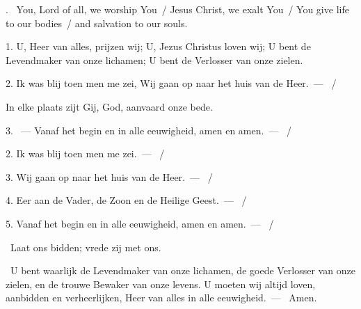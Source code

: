 \documentclass[12pt,twoside,a5paper]{article}
\begin{document}

\CLEARPAGEAV


\vspace{0.5em}

\vspace{0.4em}
\begin{doublecols}
  . \rr~You, Lord of all, we worship You~/ Jesus Christ, we exalt You~/ You give life to our bodies~/ and salvation to our souls.

   1. U, Heer van alles, prijzen wij; U, Jezus Christus loven wij; U bent de Levendmaker van onze lichamen; U bent de Verlosser van onze zielen.
\end{doublecols}

\begin{halfparskip}
  2. Ik was blij toen men me zei, Wij gaan op naar het huis van de Heer.~--- ~/ 

  \liturgicallbracket{} In elke plaats zijt Gij, God, aanvaard onze bede.\liturgicalrbracket

  3. ~--- Vanaf het begin en in alle eeuwigheid, amen en amen.~--- ~/ 

   2. Ik was blij toen men me zei.~--- ~/ 

  3. Wij gaan op naar het huis van de Heer.~--- ~/ 

  4. Eer aan de Vader, de Zoon en de Heilige Geest.~--- ~/ 

  5. Vanaf het begin en in alle eeuwigheid, amen en amen.~--- ~/ 

  \dd~Laat ons bidden; vrede zij met ons.

  \cc~U bent waarlijk de Levendmaker van onze lichamen, de goede Verlosser van onze zielen, en de trouwe Bewaker van onze levens. U moeten wij altijd loven, aanbidden en verheerlijken, Heer van alles in alle eeuwigheid.~--- \rr~Amen.
\end{halfparskip}
\end{document}
